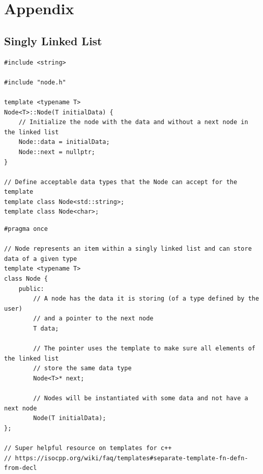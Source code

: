 \documentclass[letterpaper, 10pt,DIV=13]{scrartcl}
\numberwithin{equation}{section} %
\numberwithin{figure}{section} %
\numberwithin{table}{section} %
\begin{document}


% 
%  



\section{Appendix}
\lstset{numbers=left, numberstyle=\tiny, stepnumber=1, numbersep=5pt, basicstyle=\footnotesize\ttfamily}

\subsection{Singly Linked List}\label{nodeListing}
\begin{lstlisting}[frame=single, ]  
#include <string>

#include "node.h"

template <typename T>
Node<T>::Node(T initialData) {
    // Initialize the node with the data and without a next node in the linked list
    Node::data = initialData;
    Node::next = nullptr;
}

// Define acceptable data types that the Node can accept for the template
template class Node<std::string>;
template class Node<char>;
\end{lstlisting}

\begin{lstlisting}[frame=single, ]  
#pragma once

// Node represents an item within a singly linked list and can store data of a given type
template <typename T>
class Node {
    public:
        // A node has the data it is storing (of a type defined by the user)
        // and a pointer to the next node
        T data;

        // The pointer uses the template to make sure all elements of the linked list
        // store the same data type
        Node<T>* next;

        // Nodes will be instantiated with some data and not have a next node
        Node(T initialData);
};

// Super helpful resource on templates for c++
// https://isocpp.org/wiki/faq/templates#separate-template-fn-defn-from-decl
\end{lstlisting}
\end{document}
